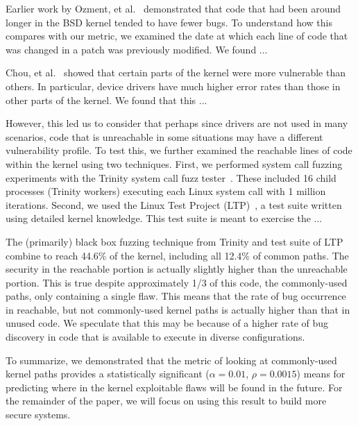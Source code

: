 Earlier work by Ozment, et al.~\cite{ozment2006milk} demonstrated that code that
had been around longer in the BSD kernel tended to have fewer bugs.  To
understand how this compares with our metric, we examined the date at which
each line of code that was changed in a patch was previously modified.  We
found ...



Chou, et al.~\cite{PittSFIeld} showed that certain parts of the kernel
were more vulnerable than others. In particular, device drivers have
much higher error rates than those in other parts of the kernel.
We found that this ...

However, this led us to consider that perhaps since drivers are not used
in many scenarios, code that is unreachable in some situations may have a
different vulnerability profile.  To test this, we
further examined the reachable lines of
code within the kernel using two techniques.  First,
we performed system call fuzzing experiments with the Trinity
system call fuzz tester~\cite{Trinity}. These included 16 child processes
(Trinity workers) executing each Linux system call with 1 million iterations.
Second, we used the Linux Test Project (LTP)~\cite{LTP}, a test suite written
using detailed kernel knowledge.  This test suite is meant to exercise the ...

The (primarily) black box fuzzing technique from Trinity and test suite of
LTP combine to reach 44.6\% of the kernel, including all 12.4\% of common
paths.  The security in the reachable portion is actually
slightly higher than the unreachable portion.  This is true despite
approximately 1/3 of this code, the commonly-used paths, only containing
a single flaw.  This means that the rate of bug occurrence in reachable, but
not commonly-used kernel paths is actually higher than that in unused
code.  We speculate that this may be because of a higher rate of bug discovery
in code that is available to execute in diverse configurations.


To summarize, we demonstrated that the metric of looking at commonly-used
kernel paths provides a statistically significant ($\alpha=0.01$,
$\rho=0.0015$) means for predicting where in the kernel exploitable flaws
will be found in the future.  For the remainder of the paper, we will
focus on using this result to build more secure systems.


